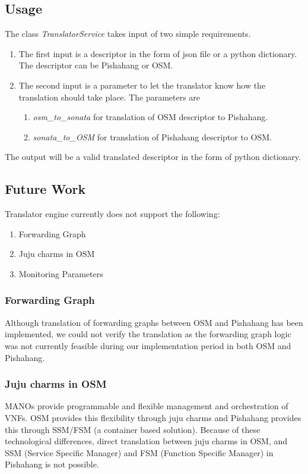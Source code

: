 \subsection{Usage}

The class \textit{TranslatorService} takes input of two simple requirements.
\begin{enumerate}
	\item The first input is a descriptor in the form of json file or a python dictionary. The descriptor can be Pishahang or OSM.
	\item The second input is a parameter to let the translator know how the translation should take place. The parameters are
	  \begin{enumerate}
	  	\item \textit{osm\_to\_sonata} for translation of OSM descriptor to Pishahang.
	  	\item \textit{sonata\_to\_OSM} for translation of Pishahang descriptor to OSM.
	  \end{enumerate}
\end{enumerate}

The output will be a valid translated descriptor in the form of python dictionary.

\subsection{Future Work}	

Translator engine currently does not support the following:
\begin{enumerate}
	\item Forwarding Graph
	\item Juju charms in OSM
	\item Monitoring Parameters
\end{enumerate}

\subsubsection{Forwarding Graph}
Although translation of forwarding graphs between OSM and  Pishahang has been implemented, we could not verify the translation as the forwarding graph logic was not currently feasible during our implementation period in both OSM and Pishahang.

\subsubsection{Juju charms in OSM}
MANOs provide programmable and flexible management and orchestration of VNFs. OSM provides this flexibility through juju charms and Pishahang provides this through SSM/FSM (a container based solution). Because of these technological differences, direct translation between juju charms in OSM, and SSM (Service Specific Manager) and FSM (Function Specific Manager) in Pishahang is not possible. 

